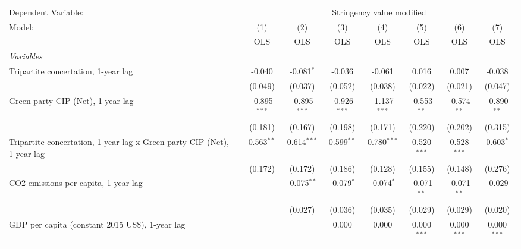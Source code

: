 
\begingroup
\centering
\begin{tabular}{lccccccc}
   \toprule
   Dependent Variable: & \multicolumn{7}{c}{Stringency value modified}\\
   Model:                                                                  & (1)            & (2)            & (3)            & (4)            & (5)           & (6)           & (7)\\  
                                                                           &  OLS           & OLS            & OLS            & OLS            & OLS           & OLS           & OLS\\  
   \midrule
   \emph{Variables}\\
   Tripartite concertation, 1-year lag                                     & -0.040         & -0.081$^{*}$   & -0.036         & -0.061         & 0.016         & 0.007         & -0.038\\   
                                                                           & (0.049)        & (0.037)        & (0.052)        & (0.038)        & (0.022)       & (0.021)       & (0.047)\\   
   Green party CIP (Net), 1-year lag                                       & -0.895$^{***}$ & -0.895$^{***}$ & -0.926$^{***}$ & -1.137$^{***}$ & -0.553$^{**}$ & -0.574$^{**}$ & -0.890$^{**}$\\   
                                                                           & (0.181)        & (0.167)        & (0.198)        & (0.171)        & (0.220)       & (0.202)       & (0.315)\\   
   Tripartite concertation, 1-year lag x Green party CIP (Net), 1-year lag & 0.563$^{**}$   & 0.614$^{***}$  & 0.599$^{**}$   & 0.780$^{***}$  & 0.520$^{***}$ & 0.528$^{***}$ & 0.603$^{*}$\\   
                                                                           & (0.172)        & (0.172)        & (0.186)        & (0.128)        & (0.155)       & (0.148)       & (0.276)\\   
   CO2 emissions per capita, 1-year lag                                    &                & -0.075$^{**}$  & -0.079$^{*}$   & -0.074$^{*}$   & -0.071$^{**}$ & -0.071$^{**}$ & -0.029\\   
                                                                           &                & (0.027)        & (0.036)        & (0.035)        & (0.029)       & (0.029)       & (0.020)\\   
   GDP per capita (constant 2015 US\$), 1-year lag                         &                &                & 0.000          & 0.000          & 0.000$^{***}$ & 0.000$^{***}$ & 0.000$^{***}$\\   

\end{tabular}
